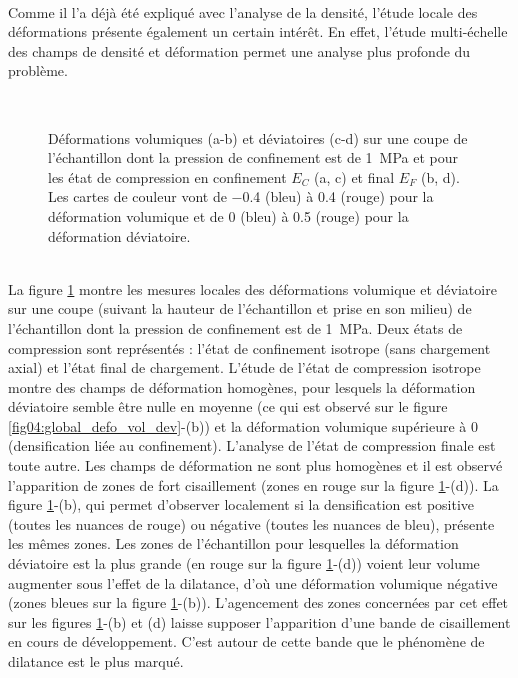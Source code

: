		\paragraph{}
		Comme il l'a déjà été expliqué avec l'analyse de la densité, l'étude locale des déformations présente également un certain intérêt. En effet, l'étude multi-échelle des champs de densité et déformation permet une analyse plus profonde du problème.
		\begin{figure}\centering
			\hfill
			\\
			\hfill
			\caption{\label{fig04:champs_deformations} Déformations volumiques (a-b) et déviatoires (c-d) sur une coupe de l'échantillon dont la pression de confinement est de \SI{1}{\mega\pascal} et pour les état de compression en confinement $E_C$ (a, c) et final $E_F$ (b, d). Les cartes de couleur vont de \num{-0.4} (bleu) à \num{0.4} (rouge) pour la déformation volumique et de \num{0} (bleu) à \num{0.5} (rouge) pour la déformation déviatoire.}
		\end{figure}
		\\La figure \ref{fig04:champs_deformations} montre les mesures locales des déformations volumique et déviatoire sur une coupe (suivant la hauteur de l'échantillon et prise en son milieu) de l'échantillon dont la pression de confinement est de \SI{1}{\mega\pascal}. Deux états de compression sont représentés : l'état de confinement isotrope (sans chargement axial) et l'état final de chargement. L'étude de l'état de compression isotrope montre des champs de déformation homogènes, pour lesquels la déformation déviatoire semble être nulle en moyenne (ce qui est observé sur le figure \ref{fig04:global_defo_vol_dev}-(b)) et la déformation volumique supérieure à \num{0} (densification liée au confinement). L'analyse de l'état de compression finale est toute autre. Les champs de déformation ne sont plus homogènes et il est observé l'apparition de zones de fort cisaillement (zones en rouge sur la figure \ref{fig04:champs_deformations}-(d)). La figure \ref{fig04:champs_deformations}-(b), qui permet d'observer localement si la densification est positive (toutes les nuances de rouge) ou négative (toutes les nuances de bleu), présente les mêmes zones. Les zones de l'échantillon pour lesquelles la déformation déviatoire est la plus grande (en rouge sur la figure \ref{fig04:champs_deformations}-(d)) voient leur volume augmenter sous l'effet de la dilatance, d'où une déformation volumique négative (zones bleues sur la figure \ref{fig04:champs_deformations}-(b)). L'agencement des zones concernées par cet effet sur les figures \ref{fig04:champs_deformations}-(b) et (d) laisse supposer l'apparition d'une bande de cisaillement en cours de développement. C'est autour de cette bande que le phénomène de dilatance est le plus marqué.
